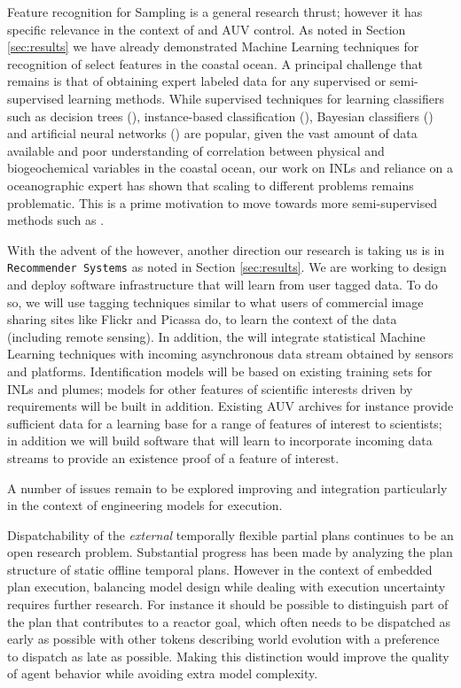 Feature recognition for Sampling is a general research thrust; however
it has specific relevance in the context of \rx and AUV control. As
noted in Section \ref{sec:results} we have already demonstrated
Machine Learning techniques for recognition of select features in the
coastal ocean. A principal challenge that remains is that of obtaining
expert labeled data for any supervised or semi-supervised learning
methods.  While supervised techniques for learning classifiers such as
decision trees (\cite{Quinlan93-dtrees}), instance-based
classification (\cite{Aha-ibl-ml91}), Bayesian classifiers
(\cite{Jensen2001-BNetworks}) and artificial neural networks
(\cite{ANNsurvey-2000}) are popular, given the vast amount of data
available and poor understanding of correlation between physical and
biogeochemical variables in the coastal ocean, our work on INLs
\cite{mcgann08d,ryan10} and reliance on a oceanographic expert has
shown that scaling to different problems remains problematic. This is
a prime motivation to move towards more semi-supervised methods such
as \cite{kumar11}. 

With the advent of the \od however, another direction our research is
taking us is in \texttt{Recommender Systems} \cite{Adomavicius05} as
noted in Section \ref{sec:results}. We are working to design and
deploy software infrastructure that will learn from user tagged
data. To do so, we will use tagging techniques similar to what users
of commercial image sharing sites like Flickr and Picassa do, to learn
the context of the data (including remote sensing). In addition, the
\od will integrate statistical Machine Learning techniques with
incoming asynchronous data stream obtained by sensors and
platforms. Identification models will be based on existing training
sets for INLs and plumes; models for other features of scientific
interests driven by \can requirements will be built in
addition. Existing AUV archives for instance provide sufficient data
for a learning base for a range of features of interest to scientists;
in addition we will build software that will learn to incorporate
incoming data streams to provide an existence proof of a feature of
interest.

A number of issues remain to be explored improving \rx and \eu
integration particularly in the context of engineering models for
execution.

Dispatchability of the {\em external} temporally flexible partial
plans continues to be an open research problem. Substantial progress
has been made \cite{vidal97,mus98a,tsam98,morris00} by analyzing the
plan structure of static offline temporal plans. However in the
context of embedded plan execution, balancing model design while
dealing with execution uncertainty requires further research. For
instance it should be possible to distinguish part of the plan that
contributes to a reactor goal, which often needs to be dispatched as
early as possible with other tokens describing world evolution with a
preference to dispatch as late as possible. Making this distinction
would improve the quality of agent behavior while avoiding extra model
complexity.

